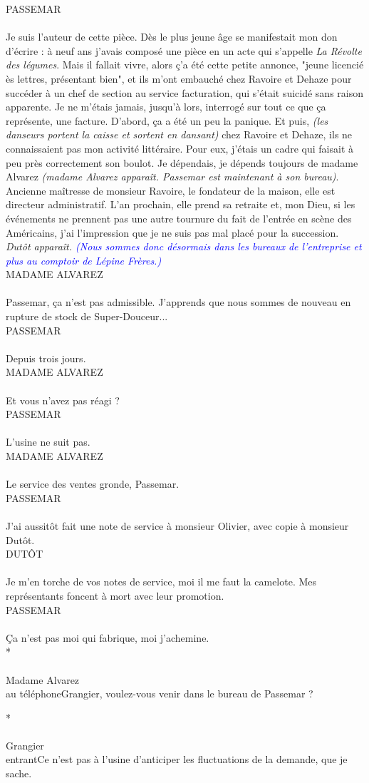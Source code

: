 \documentclass[a4paper]{report}
\newcommand{\annot}[1]{{\footnotesize \textcolor{blue}{\textit{(#1)}}}}
\newcommand{\repl}[2]{\uppercase{#1}\\\\#2\\}
\newcommand{\didas}[1]{\textit{#1}\\}
\begin{document}
\repl{Passemar}{Je suis l'auteur de cette pièce. Dès le plus jeune âge se manifestait mon don d'écrire : à neuf ans j'avais composé une pièce en un acte qui s'appelle \textit{La Révolte des légumes}. Mais il fallait vivre, alors ç'a été cette petite annonce, "jeune licencié ès lettres, présentant bien", et ils m'ont embauché chez Ravoire et Dehaze pour succéder à un chef de section au service facturation, qui s'était suicidé sans raison apparente. Je ne m'étais jamais, jusqu'à lors, interrogé sur tout ce que ça représente, une facture. D'abord, ça a été un peu la panique. Et puis, \textit{(les danseurs portent la caisse et sortent en dansant)} chez Ravoire et Dehaze, ils ne connaissaient pas mon activité littéraire. Pour eux, j'étais un cadre qui faisait à peu près correctement son boulot. Je dépendais, je dépends toujours de madame Alvarez \textit{(madame Alvarez apparaît. Passemar est maintenant à son bureau)}. Ancienne maîtresse de monsieur Ravoire, le fondateur de la maison, elle est directeur administratif. L'an prochain, elle prend sa retraite et, mon Dieu, si les événements ne prennent pas une autre tournure du fait de l'entrée en scène des Américains, j'ai l'impression que je ne suis pas mal placé pour la succession.}

\didas{Dutôt apparaît. \annot{Nous sommes donc désormais dans les bureaux de l'entreprise et plus au comptoir de Lépine Frères.}}

\repl{Madame Alvarez}{Passemar, ça n'est pas admissible. J'apprends que nous sommes de nouveau en rupture de stock de Super-Douceur...}

\repl{Passemar}{Depuis trois jours.}

\repl{Madame Alvarez}{Et vous n'avez pas réagi ?}

\repl{Passemar}{L'usine ne suit pas.}

\repl{Madame Alvarez}{Le service des ventes gronde, Passemar.}

\repl{Passemar}{J'ai aussitôt fait une note de service à monsieur Olivier, avec copie à monsieur Dutôt.}

\repl{Dutôt}{Je m'en torche de vos notes de service, moi il me faut la camelote. Mes représentants foncent à mort avec leur promotion.}

\repl{Passemar}{Ça n'est pas moi qui fabrique, moi j'achemine.}

\repl*{Madame Alvarez}{au téléphone}{Grangier, voulez-vous venir dans le bureau de Passemar ?}

\repl*{Grangier}{entrant}{Ce n'est pas à l'usine d'anticiper les fluctuations de la demande, que je sache.}
\end{document}
